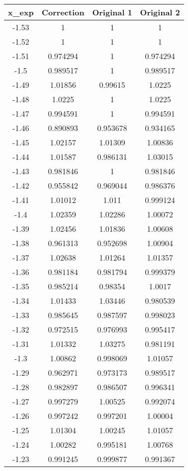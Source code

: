\begin{table}[h!]
\centering
\begin{tabular}{|c|c|c|c|}
\hline
x_exp & Correction & Original 1 & Original 2 \\
\hline
-1.53 & 1 & 1 & 1 \\
-1.52 & 1 & 1 & 1 \\
-1.51 & 0.974294 & 1 & 0.974294 \\
-1.5 & 0.989517 & 1 & 0.989517 \\
-1.49 & 1.01856 & 0.99615 & 1.0225 \\
-1.48 & 1.0225 & 1 & 1.0225 \\
-1.47 & 0.994591 & 1 & 0.994591 \\
-1.46 & 0.890893 & 0.953678 & 0.934165 \\
-1.45 & 1.02157 & 1.01309 & 1.00836 \\
-1.44 & 1.01587 & 0.986131 & 1.03015 \\
-1.43 & 0.981846 & 1 & 0.981846 \\
-1.42 & 0.955842 & 0.969044 & 0.986376 \\
-1.41 & 1.01012 & 1.011 & 0.999124 \\
-1.4 & 1.02359 & 1.02286 & 1.00072 \\
-1.39 & 1.02456 & 1.01836 & 1.00608 \\
-1.38 & 0.961313 & 0.952698 & 1.00904 \\
-1.37 & 1.02638 & 1.01264 & 1.01357 \\
-1.36 & 0.981184 & 0.981794 & 0.999379 \\
-1.35 & 0.985214 & 0.98354 & 1.0017 \\
-1.34 & 1.01433 & 1.03446 & 0.980539 \\
-1.33 & 0.985645 & 0.987597 & 0.998023 \\
-1.32 & 0.972515 & 0.976993 & 0.995417 \\
-1.31 & 1.01332 & 1.03275 & 0.981191 \\
-1.3 & 1.00862 & 0.998069 & 1.01057 \\
-1.29 & 0.962971 & 0.973173 & 0.989517 \\
-1.28 & 0.982897 & 0.986507 & 0.996341 \\
-1.27 & 0.997279 & 1.00525 & 0.992074 \\
-1.26 & 0.997242 & 0.997201 & 1.00004 \\
-1.25 & 1.01304 & 1.00245 & 1.01057 \\
-1.24 & 1.00282 & 0.995181 & 1.00768 \\
-1.23 & 0.991245 & 0.999877 & 0.991367 \\

\end{tabular}
\end{table}

